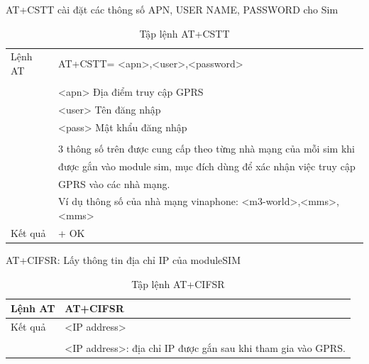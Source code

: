 AT+CSTT cài đặt các thông số APN, USER NAME, PASSWORD cho Sim
\begin{table}[H]
	\label{table:at+cstt}
	\begin{tabular}{|l|l|}
		\hline
		Lệnh AT & AT+CSTT= <apn>,<user>,<password> \\ 
		& \\
		& \hspace{0.5cm}<apn> Địa điểm truy cập GPRS\\
		& \hspace{0.5cm}<user> Tên đăng nhập\\
		& \hspace{0.5cm}<pass> Mật khẩu đăng nhập\\
		& \\
		& 3 thông số trên được cung cấp theo từng nhà mạng của mỗi sim khi \\
		& được gắn vào module sim, mục đích dùng để xác nhận việc truy cập \\
		& GPRS vào các nhà mạng.\\
		& Ví dụ thông số của nhà mạng vinaphone: <m3-world>,<mms>,<mms> \\\hline
		Kết quả  &+ OK \\\hline
	\end{tabular}
	
	\caption[Tập lệnh AT+CSTT: cài đặt các thông số APN, USER NAME, PASSWORD cho Sim]{Tập lệnh AT+CSTT}
\end{table}


\newpage

AT+CIFSR: Lấy thông tin địa chỉ IP của moduleSIM
\begin{table}[H]
	\label{table:AT+CIFS}
	\begin{tabular}{|l|l|}
		\hline
		Lệnh AT & AT+CIFSR \\ \hline
		Kết quả  & 
		<IP address> \\
		& \\
		& <IP address>: địa chỉ IP được gắn sau khi tham gia vào GPRS.\\\hline
	\end{tabular}
	
	\caption[Tập lệnh AT+CIFSR: lấy thông tin địa chỉ IP của moduleSIM]{Tập lệnh AT+CIFSR}
\end{table}


